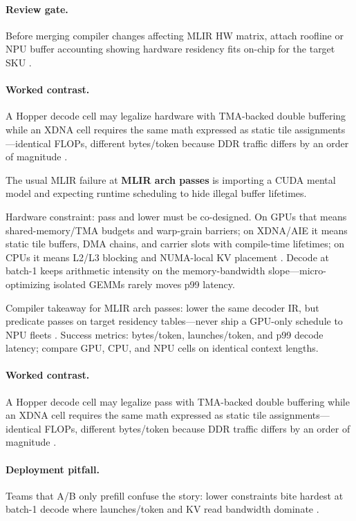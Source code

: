 \paragraph{Review gate.} Before merging compiler changes affecting MLIR HW matrix, attach roofline or NPU buffer accounting showing hardware residency fits on-chip for the target SKU \citep{amd2024xdna,amd2024aie}.

\paragraph{Worked contrast.} A Hopper decode cell may legalize hardware with TMA-backed double buffering while an XDNA cell requires the same math expressed as static tile assignments---identical FLOPs, different bytes/token because DDR traffic differs by an order of magnitude \citep{amd2024xdna,amd2024aie}.

The usual MLIR failure at \textbf{MLIR arch passes} is importing a CUDA mental model and expecting runtime scheduling to hide illegal buffer lifetimes.

Hardware constraint: pass and lower must be co-designed. On GPUs that means shared-memory/TMA budgets and warp-grain barriers; on XDNA/AIE it means static tile buffers, DMA chains, and carrier slots with compile-time lifetimes; on CPUs it means L2/L3 blocking and NUMA-local KV placement \citep{yirage2026,chen2020compilerbasedhardw}. Decode at batch-1 keeps arithmetic intensity on the memory-bandwidth slope---micro-optimizing isolated GEMMs rarely moves p99 latency.

Compiler takeaway for MLIR arch passes: lower the same decoder IR, but predicate passes on target residency tables---never ship a GPU-only schedule to NPU fleets \citep{yirage2026,chen2020compilerbasedhardw}. Success metrics: bytes/token, launches/token, and p99 decode latency; compare GPU, CPU, and NPU cells on identical context lengths.

\paragraph{Worked contrast.} A Hopper decode cell may legalize pass with TMA-backed double buffering while an XDNA cell requires the same math expressed as static tile assignments---identical FLOPs, different bytes/token because DDR traffic differs by an order of magnitude \citep{yirage2026,chen2020compilerbasedhardw}.

\paragraph{Deployment pitfall.} Teams that A/B only prefill confuse the story: lower constraints bite hardest at batch-1 decode where launches/token and KV read bandwidth dominate \citep{yirage2026,chen2020compilerbasedhardw}.

